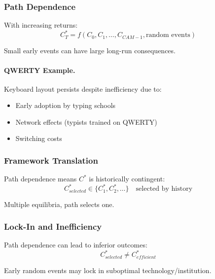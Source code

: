 \subsubsection{Path Dependence}

With increasing returns:
\begin{equation}
\boxed{
C^*_T = f(C_0, C_1, \ldots, C_{CAM-1}, \text{random events})
}
\label{eq:path-dependence}
\end{equation}

Small early events can have large long-run consequences.

\paragraph{QWERTY Example.}
Keyboard layout persists despite inefficiency due to:
\begin{itemize}
    \item Early adoption by typing schools
    \item Network effects (typists trained on QWERTY)
    \item Switching costs
\end{itemize}

\subsubsection{Framework Translation}

Path dependence means $C^*$ is historically contingent:
\begin{equation}
C^*_{selected} \in \{C^*_1, C^*_2, \ldots\} \quad \text{selected by history}
\end{equation}

Multiple equilibria, path selects one.

\subsubsection{Lock-In and Inefficiency}

Path dependence can lead to inferior outcomes:
\begin{equation}
C^*_{selected} \neq C^*_{efficient}
\end{equation}

Early random events may lock in suboptimal technology/institution.

